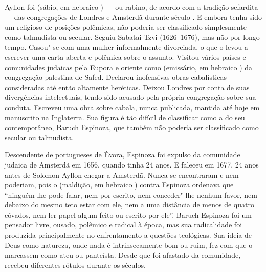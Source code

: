 \begin{multicols}{2}
\baselineskip
\lineskip=1pt
\noindent{}Ayllon foi {} (sábio, em hebraico {}) --- ou rabino, de acordo com a tradição sefardita --- das congregações de Londres e Amsterdã durante século . E embora tenha sido um religioso de posições polêmicas, não poderia ser classificado simplesmente como talmudista ou secular. Seguiu Sabatai Tzvi (1626--1676), mas não por longo tempo. Casou"-se com uma mulher informalmente divorciada, o que o levou a escrever uma carta aberta e polêmica sobre o assunto. Visitou vários países e comunidades judaicas pela Eupora e oriente como {} (emissário, em hebraico {}) da congregação palestina de Safed. Declarou inofensivas obras cabalísticas consideradas até então altamente heréticas. Deixou Londres por conta de suas divergências intelectuais, tendo sido acusado pela própria congregação sobre sua conduta. Escreveu uma obra sobre cabala, nunca publicada, mantida até hoje em manuscrito na Inglaterra. Sua figura é tão difícil de classificar como a do seu contemporâneo, Baruch Espinoza, que também não poderia ser classificado como secular ou talmudista.

\vspace{\baselineskip}

{\small{}}

\vspace{\baselineskip}

Descendente de portugueses de Évora, Espinoza foi expulso da comunidade judaica de Amsterdã em 1656, quando tinha 24 anos. E faleceu em 1677, 24 anos antes de Solomon Ayllon chegar a Amsterdã. Nunca se encontraram e nem poderiam, pois o {} (maldição, em hebraico {}) contra Espinoza ordenava que ``ninguém lhe pode falar, nem por escrito, nem conceder"-lhe nenhum favor, nem debaixo do mesmo teto estar com ele, nem a uma distância de menos de quatro côvados, nem ler papel algum feito ou escrito por ele''. Baruch Espinoza foi um pensador livre, ousado, polêmico e radical à época, mas sua radicalidade foi produzida principalmente no enfrentamento a questões teológicas. Sua ideia de Deus como natureza, onde nada é intrinsecamente bom ou ruim, fez com que o marcassem como ateu ou panteísta. Desde que foi afastado da comunidade, recebeu diferentes rótulos durante os séculos.


\end{multicols}
